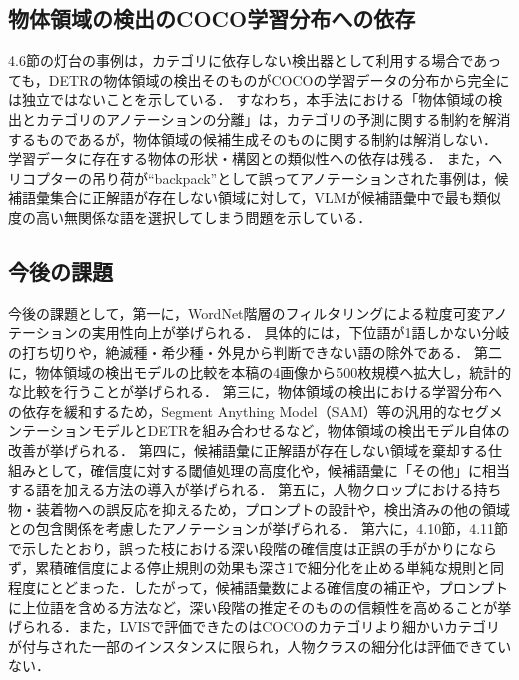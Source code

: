 \subsection{物体領域の検出のCOCO学習分布への依存}
4.6節の灯台の事例は，カテゴリに依存しない検出器として利用する場合であっても，DETRの物体領域の検出そのものがCOCOの学習データの分布から完全には独立ではないことを示している．
すなわち，本手法における「物体領域の検出とカテゴリのアノテーションの分離」は，カテゴリの予測に関する制約を解消するものであるが，物体領域の候補生成そのものに関する制約は解消しない．
学習データに存在する物体の形状・構図との類似性への依存は残る．
また，ヘリコプターの吊り荷が``backpack''として誤ってアノテーションされた事例は，候補語彙集合に正解語が存在しない領域に対して，VLMが候補語彙中で最も類似度の高い無関係な語を選択してしまう問題を示している．

\subsection{今後の課題}
今後の課題として，第一に，WordNet階層のフィルタリングによる粒度可変アノテーションの実用性向上が挙げられる．
具体的には，下位語が1語しかない分岐の打ち切りや，絶滅種・希少種・外見から判断できない語の除外である．
第二に，物体領域の検出モデルの比較を本稿の4画像から500枚規模へ拡大し，統計的な比較を行うことが挙げられる．
第三に，物体領域の検出における学習分布への依存を緩和するため，Segment Anything Model（SAM）等の汎用的なセグメンテーションモデルとDETRを組み合わせるなど，物体領域の検出モデル自体の改善が挙げられる．
第四に，候補語彙に正解語が存在しない領域を棄却する仕組みとして，確信度に対する閾値処理の高度化や，候補語彙に「その他」に相当する語を加える方法の導入が挙げられる．
第五に，人物クロップにおける持ち物・装着物への誤反応を抑えるため，プロンプトの設計や，検出済みの他の領域との包含関係を考慮したアノテーションが挙げられる．
第六に，4.10節，4.11節で示したとおり，誤った枝における深い段階の確信度は正誤の手がかりにならず，累積確信度による停止規則の効果も深さ1で細分化を止める単純な規則と同程度にとどまった．したがって，候補語彙数による確信度の補正や，プロンプトに上位語を含める方法など，深い段階の推定そのものの信頼性を高めることが挙げられる．また，LVISで評価できたのはCOCOのカテゴリより細かいカテゴリが付与された一部のインスタンスに限られ，人物クラスの細分化は評価できていない．
